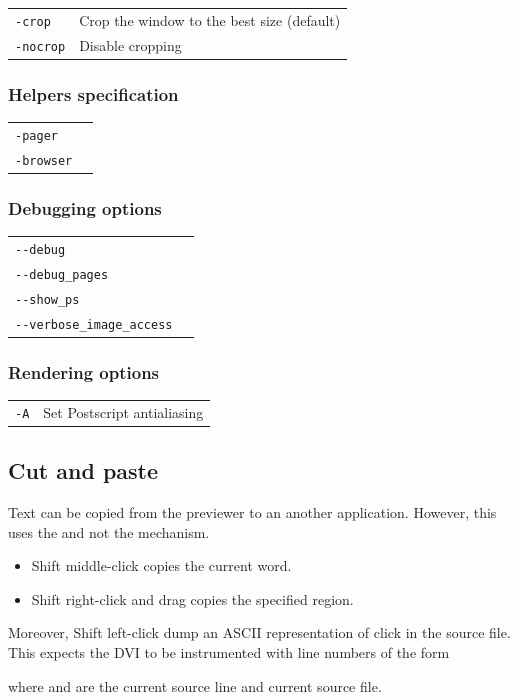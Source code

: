 \documentclass[12pt]{article}
\begin{document}
\medskip\noindent\begin{tabular}{ll}
\verb"-crop"               & Crop the window to the best size (default) \\
\verb"-nocrop"             & Disable cropping
\end{tabular}

\subsubsection*{Helpers specification}

\medskip\noindent\begin{tabular}{ll}
\verb"-pager" & \\
\verb"-browser" & \\
\end{tabular}

\subsubsection*{Debugging options}

\medskip\noindent\begin{tabular}{ll}
\verb"--debug" & \\
\verb"--debug_pages" & \\
\verb"--show_ps" & \\
\verb"--verbose_image_access" & \\
\end{tabular}

\subsubsection*{Rendering options}

\medskip\noindent\begin{tabular}{ll}
\verb"-A" & Set Postscript antialiasing \\
\end{tabular}

\subsection {Cut and paste}

Text can be copied from the {\ActiveDVI} previewer to an another application.
However, this uses the  and not the 
mechanism.
\begin {itemize}
\item
Shift middle-click copies the current word. 
\item
Shift right-click and drag copies the specified region. 
\end {itemize}
Moreover, Shift left-click dump an ASCII representation of click 
in the source file. This expects the DVI to be instrumented with line
numbers of the form
\begin{quote}
  
\end{quote}
where  and  are the current source line and
current source file.
\end{document}
